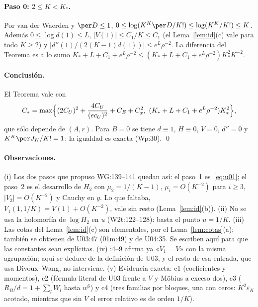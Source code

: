 \paragraph{Paso 0: $2\le K<K_*$.} Por van der Waerden y $\per D\le1$,
$0\le\log(K^K\per D/K!)\le\log(K^K/K!)\le K$. Además $0\le\log d(1)\le L$, $|V(1)|\le C_1/K\le C_1$
(el Lema~\ref{lem:id}(c) vale para todo $K\ge2$) y $|d''(1)/(2(K-1)d(1))|\le e^L\rho^{-2}$. La
diferencia del Teorema es a lo sumo $K_*+L+C_1+e^L\rho^{-2}\le(K_*+L+C_1+e^L\rho^{-2})K_*^2K^{-2}$.

\paragraph{Conclusión.} El Teorema vale con
\[
 C_*=\max\Bigl\{(2C_U)^2+\frac{4C_U}{(ec_U)^2}+C_E+C_x^2,\ (K_*+L+C_1+e^L\rho^{-2})K_*^2\Bigr\},
\]
que sólo depende de $(A,r)$. Para $B=0$ se tiene $d\equiv1$, $H\equiv0$, $V=0$, $d''=0$ y
$K^K\per J_K/K!=1$: la igualdad es exacta (Wp:30). \qed

\paragraph{Observaciones.}
(i) Los dos pasos que propuso WG:139--141 quedan así: el paso~1 es~\eqref{eq:u01}; el paso~2 es
el desarrollo de $H_2$ con $\mu_2=1/(K-1)$, $\mu_i=O(K^{-2})$ para $i\ge3$, $|V_2|=O(K^{-2})$ y Cauchy
en $y$. Lo que faltaba, $V_1(1,1/K)=V(1)+O(K^{-2})$, vale sin resto (Lema~\ref{lem:id}(b)).
(ii) No se usa la holomorfía de $\log H_2$ en $u$ (W2t:122--128): basta el punto $u=1/K$.
(iii) Las cotas del Lema~\ref{lem:id}(c) son elementales, por el Lema~\ref{lem:cotas}(a); también
se obtienen de U03:47 (01m:49) y de U04:35. Se escriben aquí para que las constantes sean explícitas.
(iv) :4--9 afirma ya
«$V_1=V$» con la misma agrupación; aquí se deduce de la definición de U03, y el resto de esa
entrada, que usa Divoux--Wang, no interviene.
(v) Evidencia exacta: c1 (coeficientes y momentos), c2 (fórmula literal de U03 frente a $V$ y
Möbius a exceso dos), c3 ($R_B/d=1+\sum_lW_l$ hasta $w^6$) y c4 (tres familias por bloques,
una con ceros: $K^2\varepsilon_K$ acotado, mientras que sin $V$ el error relativo es de orden $1/K$).
